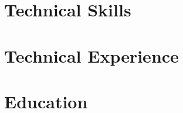 \documentclass[letter,10pt]{article}
\begin{document}


\section{Technical Skills}


\section{Technical Experience}


\section{Education}

\end{document}
